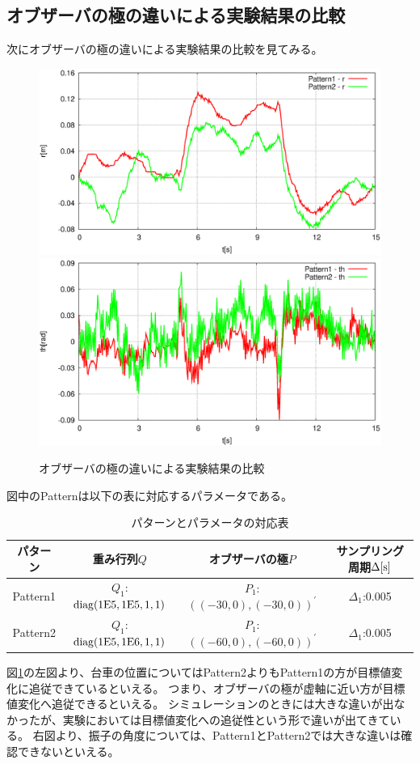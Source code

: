 	\subsection{オブザーバの極の違いによる実験結果の比較}
	次にオブザーバの極の違いによる実験結果の比較を見てみる。
	\begin{figure}[H]
		\centering
		\includegraphics[width=0.49\linewidth]{gazo/Compare_obs_R.eps}
		\includegraphics[width=0.49\linewidth]{gazo/Compare_obs_TH.eps}
		\caption{オブザーバの極の違いによる実験結果の比較}
		\label{image:comp_obs}
	\end{figure}
	図中のPatternは以下の表に対応するパラメータである。
	\begin{table}[H]
		\begin{center}
			\caption{パターンとパラメータの対応表}
			\medskip
			
			\begin{tabular}{|c|c|c|c|}\hline
				パターン & 重み行列$Q$ & オブザーバの極$P$ & サンプリング周期$\Delta[\rm{s}]$ \\ \hline\hline
				Pattern1 & $Q_1$:$\rm{diag}(1E5,1E5,1,1)$ & $P_1$:$((-30,0),(-30,0))^{'}$ & $\Delta_1$:0.005 \\ \hline
				Pattern2 & $Q_1$:$\rm{diag}(1E5,1E6,1,1)$ & $P_1$:$((-60,0),(-60,0))^{'}$ & $\Delta_1$:0.005 \\ \hline
			\end{tabular}
		\end{center}
		\label{table:huriage_control}
	\end{table}
	図\ref{image:comp_obs}の左図より、台車の位置についてはPattern2よりもPattern1の方が目標値変化に追従できているといえる。
	つまり、オブザーバの極が虚軸に近い方が目標値変化へ追従できるといえる。
	シミュレーションのときには大きな違いが出なかったが、実験においては目標値変化への追従性という形で違いが出てきている。
	右図より、振子の角度については、Pattern1とPattern2では大きな違いは確認できないといえる。
	\newpage
